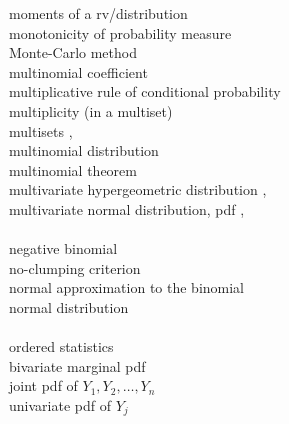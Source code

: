 \documentclass[12pt]{article}
\begin{document}
\noindent moments of a rv/distribution \pageref{moments}\\
\noindent monotonicity of probability measure \pageref{monotonicity}\\
\noindent Monte-Carlo method \pageref{montecarlomethod}\\
\noindent multinomial coefficient \pageref{multinomialcoeff2}\\
\noindent multiplicative rule of conditional probability \pageref{multrulecondprob}\\
\noindent multiplicity (in a multiset) \pageref{d:multiplicity}\\
\noindent multisets \pageref{multisets1}, \pageref{d:multiset}\\
\noindent multinomial distribution \pageref{multinomialdist}\\
\noindent multinomial theorem \pageref{multinomialtheorem}\\
\noindent multivariate hypergeometric distribution \pageref{multivariatehypergeom1}, \pageref{multivariatehypergeom}\\
\noindent multivariate normal distribution, pdf \pageref{multivariatenormaldist}, \pageref{kvariatenormalpdf}\\

\\
\noindent negative binomial \pageref{d:negbinom}\\
\noindent no-clumping criterion \pageref{noclumping}\\
\noindent normal approximation to the binomial \pageref{normalapproxtobinomial}\\
\noindent normal distribution \pageref{normaldist}\\

\\
\noindent ordered statistics \pageref{orderstatistics}\\
\noindent \quad bivariate marginal pdf \pageref{bivariatemarginalYiYj}\\
\noindent \quad joint pdf of $Y_1,Y_2,\dots,Y_n$ \pageref{jointpdfoforderedstatistics}\\
\noindent \quad univariate pdf of $Y_j$ \pageref{pdfofYj}\\
\end{document}
